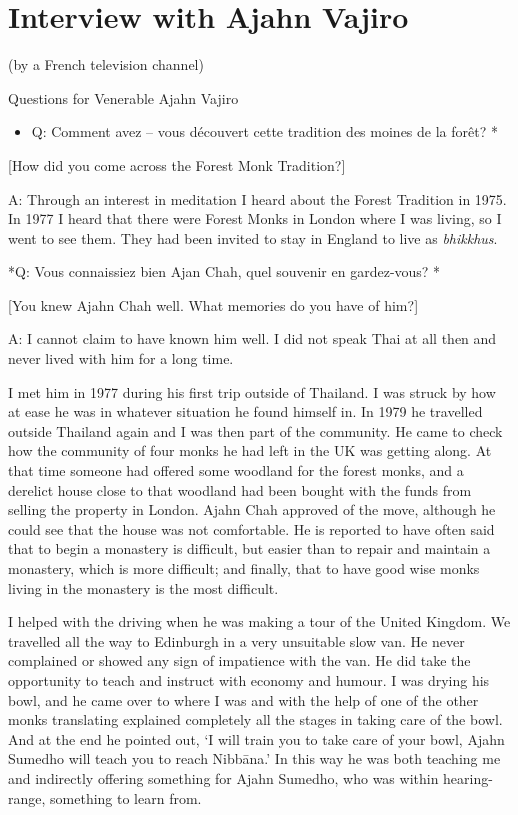 
\chapter{Interview with Ajahn Vajiro}

 (by a French television channel) 

Questions for Venerable Ajahn Vajiro

\begin{itemize}
\item
  Q: Comment avez -- vous découvert cette tradition des moines de la
  forêt? *
\end{itemize}

{[}How did you come across the Forest Monk Tradition?{]}

A: Through an interest in meditation I heard about the Forest Tradition
in 1975. In 1977 I heard that there were Forest Monks in London where I
was living, so I went to see them. They had been invited to stay in
England to live as \emph{bhikkhus}. 

*Q: Vous connaissiez bien Ajan Chah, quel souvenir en gardez-vous? *

{[}You knew Ajahn Chah well. What memories do you have of him?{]}

A: I cannot claim to have known him well. I did not speak Thai at all
then and never lived with him for a long time. 

I met him in 1977 during his first trip outside of Thailand. I was
struck by how at ease he was in whatever situation he found himself in. 
In 1979 he travelled outside Thailand again and I was then part of the
community. He came to check how the community of four monks he had left
in the UK was getting along. At that time someone had offered some
woodland for the forest monks, and a derelict house close to that
woodland had been bought with the funds from selling the property in
London. Ajahn Chah approved of the move, although he could see that the
house was not comfortable. He is reported to have often said that to
begin a monastery is difficult, but easier than to repair and maintain a
monastery, which is more difficult; and finally, that to have good wise
monks living in the monastery is the most difficult. 

I helped with the driving when he was making a tour of the United
Kingdom. We travelled all the way to Edinburgh in a very unsuitable slow
van. He never complained or showed any sign of impatience with the van. 
He did take the opportunity to teach and instruct with economy and
humour. I was drying his bowl, and he came over to where I was and with
the help of one of the other monks translating explained completely all
the stages in taking care of the bowl. And at the end he pointed out, `I
will train you to take care of your bowl, Ajahn Sumedho will teach you
to reach Nibbāna.' In this way he was both teaching me and indirectly
offering something for Ajahn Sumedho, who was within hearing-range, 
something to learn from. 

